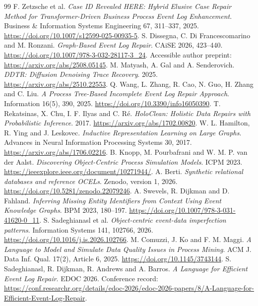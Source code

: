 \documentclass[11pt]{article}
\begin{document}
\begin{thebibliography}{99}
 F. Zetzsche et al. \emph{Case ID Revealed HERE: Hybrid Elusive Case Repair Method for Transformer-Driven Business Process Event Log Enhancement}. Business \& Information Systems Engineering 67, 311--337, 2025. \url{https://doi.org/10.1007/s12599-025-00935-5}.
 S. Dissegna, C. Di Francescomarino and M. Ronzani. \emph{Graph-Based Event Log Repair}. CAiSE 2026, 423--440. \url{https://doi.org/10.1007/978-3-032-28117-3_24}. Accessible author preprint: \url{https://arxiv.org/abs/2508.05145}.
 M. Matyash, A. Gal and A. Senderovich. \emph{DDTR: Diffusion Denoising Trace Recovery}. 2025. \url{https://arxiv.org/abs/2510.22553}.
 Q. Wang, L. Zhang, R. Cao, N. Guo, H. Zhang and C. Liu. \emph{A Process Tree-Based Incomplete Event Log Repair Approach}. Information 16(5), 390, 2025. \url{https://doi.org/10.3390/info16050390}.
 T. Rekatsinas, X. Chu, I. F. Ilyas and C. R\'e. \emph{HoloClean: Holistic Data Repairs with Probabilistic Inference}. 2017. \url{https://arxiv.org/abs/1702.00820}.
 W. L. Hamilton, R. Ying and J. Leskovec. \emph{Inductive Representation Learning on Large Graphs}. Advances in Neural Information Processing Systems 30, 2017. \url{https://arxiv.org/abs/1706.02216}.
 B. Knopp, M. Pourbafrani and W. M. P. van der Aalst. \emph{Discovering Object-Centric Process Simulation Models}. ICPM 2023. \url{https://ieeexplore.ieee.org/document/10271944/}.
 A. Berti. \emph{Synthetic relational databases and reference OCELs}. Zenodo, version 1, 2026. \url{https://doi.org/10.5281/zenodo.22079246}.
 A. Swevels, R. Dijkman and D. Fahland. \emph{Inferring Missing Entity Identifiers from Context Using Event Knowledge Graphs}. BPM 2023, 180--197. \url{https://doi.org/10.1007/978-3-031-41620-0_11}.
 S. Sadeghianasl et al. \emph{Object-centric event-data imperfection patterns}. Information Systems 141, 102766, 2026. \url{https://doi.org/10.1016/j.is.2026.102766}.
 M. Comuzzi, J. Ko and F. M. Maggi. \emph{A Language to Model and Simulate Data Quality Issues in Process Mining}. ACM J. Data Inf. Qual. 17(2), Article 6, 2025. \url{https://doi.org/10.1145/3743144}.
 S. Sadeghianasl, R. Dijkman, R. Andrews and A. Barros. \emph{A Language for Efficient Event Log Repair}. EDOC 2026. Conference record: \url{https://conf.researchr.org/details/edoc-2026/edoc-2026-papers/8/A-Language-for-Efficient-Event-Log-Repair}.

\end{thebibliography}
\end{document}
